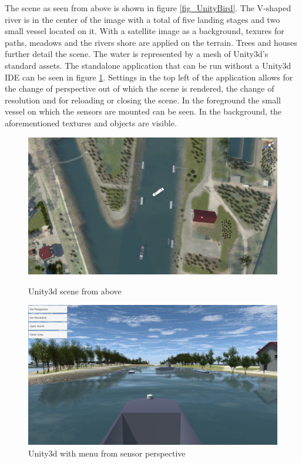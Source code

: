 The scene as seen from above is shown in figure \ref{fig_UnityBird}. The V-shaped river is in the center of the image with a total of five landing stages and two small vessel located on it. With a satellite image as a background, texures for paths, meadows and the rivers shore are applied on the terrain. Trees and houses further detail the scene. The water is represented by a mesh of Unity3d's standard assets. The standalone application that can be run without a Unity3d IDE can be seen in figure \ref{fig_UnityPerson}. Settings in the top left of the application allows for the change of perspective out of which the scene is rendered, the change of resolution and for reloading or closing the scene. In the foreground the small vessel on which the sensors are mounted can be seen. In the background, the aforementioned textures and objects are visible.
 \begin{figure}[!htb]
 	\begin{minipage}[t]{0.48\textwidth}
 		\centering
 		\includegraphics[width=.99\linewidth]{Bilder/UnitySceneBird.png}
 		\caption{Unity3d scene from above}\label{fig_UnityBird}
 	\end{minipage}\hfill
 	\begin{minipage}[t]{0.48\textwidth}
 		\centering
 		\includegraphics[width=.99\linewidth]{Bilder/UnitySceneFirstPerson.png}
 		\caption{Unity3d with menu from sensor perspective}\label{fig_UnityPerson}
 	\end{minipage}
 \end{figure}



